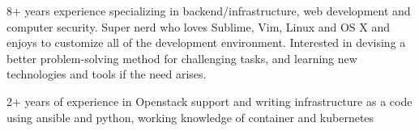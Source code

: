 

\begin{cvparagraph}

8+ years experience specializing in backend/infrastructure,
web development and computer security. Super nerd who loves Sublime, Vim,
Linux and OS X and enjoys to customize all of the development environment.
Interested in devising a better problem-solving method for challenging tasks,
and learning new technologies and tools if the need arises.

2+ years of experience in Openstack support and writing infrastructure as a code
using ansible and python, working knowledge of container and kubernetes
\end{cvparagraph}


